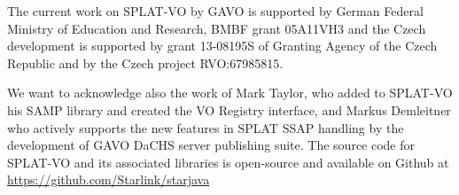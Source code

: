 \documentclass[final,authoryear,5p,times,twocolumn]{elsarticle}
\begin{document}
The current work on SPLAT-VO by GAVO is supported by German Federal
Ministry of Education and Research, BMBF grant 05A11VH3 and the Czech
development is supported by grant 13-08195S of Granting Agency of the
Czech Republic and by the Czech project RVO:67985815.

We want to acknowledge also the work of Mark Taylor, who added to
SPLAT-VO his SAMP library and created the VO Registry interface, and
Markus Demleitner who actively supports the new features in SPLAT SSAP
handling by the development of GAVO DaCHS server publishing suite.
The source code for SPLAT-VO and its associated libraries is
open-source and available on Github at
\url{https://github.com/Starlink/starjava}



\end{document}
